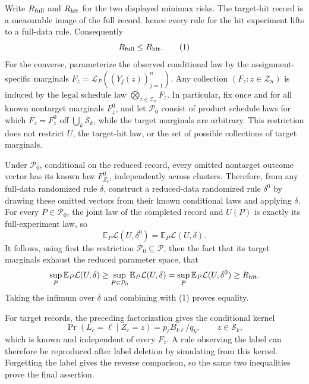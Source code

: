 Write \(R_{\rm full}\) and \(R_{\rm hit}\) for the two displayed minimax risks.  The target-hit record is a measurable image of the full record. hence every rule for the hit experiment lifts to a full-data rule.  Consequently
\[
 R_{\rm full}\leq R_{\rm hit}. \tag{1}
\]
For the converse, parameterize the observed conditional law by the assignment-specific marginals \(F_z=\mathcal L_P((Y_j(z))_{j=1}^n)\).  Any collection \((F_z:z\in\mathcal Z_n)\) is induced by the legal schedule law \(\bigotimes_{z\in\mathcal Z_n}F_z\).  In particular, fix once and for all known nontarget marginals \(F_z^0\), and let \(\mathcal P_0\) consist of product schedule laws for which \(F_z=F_z^0\) off \(\bigcup_k\mathcal S_k\), while the target marginals are arbitrary.  This restriction does not restrict \(U\), the target-hit law, or the set of possible collections of target marginals.

Under \(\mathcal P_0\), conditional on the reduced record, every omitted nontarget outcome vector has its known law \(F_{Z_c}^0\), independently across clusters.  Therefore, from any full-data randomized rule \(\delta\), construct a reduced-data randomized rule \(\delta^0\) by drawing these omitted vectors from their known conditional laws and applying \(\delta\).  For every \(P\in\mathcal P_0\), the joint law of the completed record and \(U(P)\) is exactly its full-experiment law, so
\[
 \mathbb E_P\mathcal L(U,\delta^0)=\mathbb E_P\mathcal L(U,\delta).
\]
It follows, using first the restriction \(\mathcal P_0\subseteq\mathcal P\), then the fact that its target marginals exhaust the reduced parameter space, that
\[
 \sup_{P}\mathbb E_P\mathcal L(U,\delta)
 \geq \sup_{P\in\mathcal P_0}\mathbb E_P\mathcal L(U,\delta)
 =\sup_P\mathbb E_P\mathcal L(U,\delta^0)
 \geq R_{\rm hit}.
\]
Taking the infimum over \(\delta\) and combining with (1) proves equality.

For target records, the preceding factorization gives the conditional kernel
\[
 \Pr(L_c=\ell\mid Z_c=z)=p_\ell B_{k\ell}/q_k,\qquad z\in\mathcal S_k,
\]
which is known and independent of every \(F_z\).  A rule observing the label can therefore be reproduced after label deletion by simulating from this kernel.  Forgetting the label gives the reverse comparison, so the same two inequalities prove the final assertion.